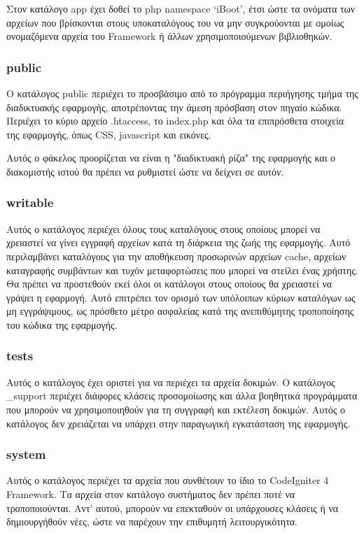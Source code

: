 Στον κατάλογο app έχει δοθεί το php namespace `iBoot', έτσι ώστε τα ονόματα των αρχείων που βρίσκονται στους υποκαταλόγους του να μην συγκρούονται με ομοίως ονομαζόμενα αρχεία του Framework ή άλλων χρησιμοποιούμενων βιβλιοθηκών.

\subsubsection{public} \label{ui:public}
Ο κατάλογος public περιέχει το προσβάσιμο από το πρόγραμμα περιήγησης τμήμα της διαδικτυακής εφαρμογής, αποτρέποντας την άμεση πρόσβαση στον πηγαίο κώδικα. Περιέχει το κύριο αρχείο .htaccess, το index.php και όλα τα επιπρόσθετα στοιχεία της εφαρμογής, όπως CSS, javascript και εικόνες.

Αυτός ο φάκελος προορίζεται να είναι η "διαδικτυακή ρίζα" της εφαρμογής και ο διακομιστής ιστού θα πρέπει να ρυθμιστεί ώστε να δείχνει σε αυτόν.

\subsubsection{writable} \label{ui:writable}
Αυτός ο κατάλογος περιέχει όλους τους καταλόγους στους οποίους μπορεί να χρειαστεί να γίνει εγγραφή αρχείων κατά τη διάρκεια της ζωής της εφαρμογής. Αυτό περιλαμβάνει καταλόγους για την αποθήκευση προσωρινών αρχείων cache, αρχείων καταγραφής συμβάντων και τυχόν μεταφορτώσεις που μπορεί να στείλει ένας χρήστης. Θα πρέπει να προστεθούν εκεί όλοι οι κατάλογοι στους οποίους θα χρειαστεί να γράψει η εφαρμογή. Αυτό επιτρέπει τον ορισμό των υπόλοιπων κύριων καταλόγων ως μη εγγράψιμους, ως πρόσθετο μέτρο ασφαλείας κατά της ανεπιθύμητης τροποποίησης του κώδικα της εφαρμογής.

\subsubsection{tests} \label{ui:tests}
Αυτός ο κατάλογος έχει οριστεί για να περιέχει τα αρχεία δοκιμών. Ο κατάλογος \_support περιέχει διάφορες κλάσεις προσομοίωσης και άλλα βοηθητικά προγράμματα που μπορούν να χρησιμοποιηθούν για τη συγγραφή και εκτέλεση δοκιμών. Αυτός ο κατάλογος δεν χρειάζεται να υπάρχει στην παραγωγική εγκατάσταση της εφαρμογής.

\subsubsection{system} \label{ui:system}
Αυτός ο κατάλογος περιέχει τα αρχεία που συνθέτουν το ίδιο το CodeIgniter 4 Framework. Tα αρχεία στον κατάλογο συστήματος δεν πρέπει ποτέ να τροποποιούνται. Αντ' αυτού, μπορούν να επεκταθούν οι υπάρχουσες κλάσεις ή να δημιουργήθούν νέες, ώστε να παρέχουν την επιθυμητή λειτουργικότητα.

